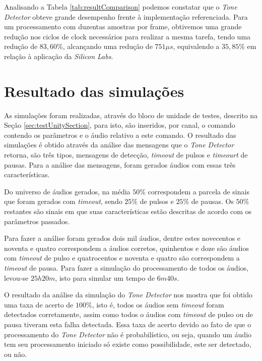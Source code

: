 \documentclass[monografia]{subfiles}
\begin{document}
			Analisando a Tabela \ref{tab:resultComparison} podemos constatar que o \textit{Tone Detector} obteve grande desempenho frente à implementação referenciada. Para um processamento
			com duzentas amostras por frame, obtivemos uma grande redução nos ciclos de clock necessários para realizar a mesma tarefa, tendo uma redução de 
			$83,60\%$, alcançando uma redução de $751 \mu s$, equivalendo a $35,85 \%$ em relação à aplicação da \textit{Silicon Labs}. 




		\section{Resultado das simulações}
			As simulações foram realizadas, através do bloco de unidade de testes, descrito na Seção \ref{sec:testUnitySection}, para isto, são inseridos, 
			por canal, o comando contendo os parâmetros e o áudio relativo a este comando.
			O resultado das simulações é obtido através da análise das mensagens que o \textit{Tone Detector} retorna, são três tipos, mensagens de detecção,
			\textit{timeout} de pulsos e \textit{timeourt} de pausas. Para a análise das mensagens, foram gerados áudios com essas três características.

			Do universo de áudios gerados, na média $50\%$ correspondem a parcela de sinais que foram gerados com \textit{timeout}, sendo $25\%$ de pulsos e
			$25\%$ de pausas. Os $50\%$ restantes são sinais em que suas características estão descritas de acordo com os parâmetros passados.

			Para fazer a análise foram gerados dois mil áudios, dentre estes novecentos e noventa e quatro correspondem a áudios corretos, 
			quinhentos e doze são áudios com \textit{timeout} de pulso e
			quatrocentos e noventa e quatro são correspondem a \textit{timeout} de pausa. Para fazer a simulação do processamento de todos os áudios,
			levou-se $25h20m$, isto para simular um tempo de $6m40s$. 

			O resultado da análise da simulação do \textit{Tone Detector} nos mostra que foi obtido uma taxa de acerto de $100\%$, isto é,
			todos os áudios sem \textit{timeout} foram detectados corretamente, assim como todos o áudios com \textit{timeout} de pulso ou de pausa tiveram
			esta falha detectada.
			Essa taxa de acerto devido ao fato de que o processamento do \textit{Tone Detector} não é probabilístico, ou seja, quando um áudio tem seu processamento
			iniciado só existe como possibilidade, este ser detectado, ou não.








	
\end{document}
